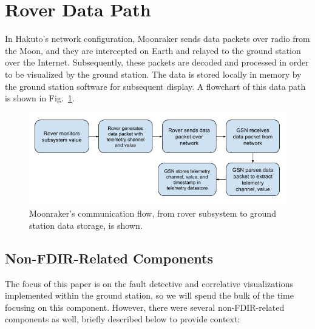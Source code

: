 \section{Rover Data Path}

In Hakuto's network configuration, Moonraker sends data packets over radio from the Moon, and they are intercepted on Earth and relayed to the ground station over the Internet. Subsequently, these packets are decoded and processed in order to be visualized by the ground station. The data is stored locally in memory by the ground station software for subsequent display. A flowchart of this data path is shown in Fig.~\ref{fig:data_path}.

\begin{figure}[h]
\centering
    \includegraphics[width=\columnwidth]{images/rover_data_flow.png}
    \caption{Moonraker's communication flow, from rover subsystem to ground station data storage, is shown.}
    \label{fig:data_path}
\end{figure}

\subsection{Non-FDIR-Related Components}

The focus of this paper is on the fault detective and correlative visualizations implemented within the ground station, so we will spend the bulk of the time focusing on this component. However, there were several non-FDIR-related components as well, briefly described below to provide context:

